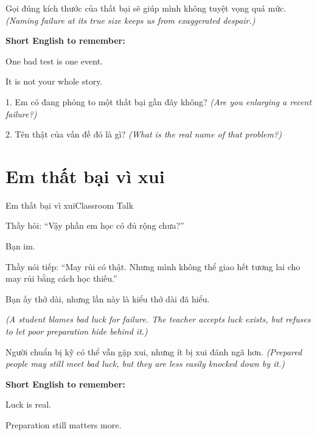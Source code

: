 \begin{baihoc}
Gọi đúng kích thước của thất bại sẽ giúp mình không tuyệt vọng quá mức.
\textit{(Naming failure at its true size keeps us from exaggerated despair.)}
\end{baihoc}

\begin{ghinhoanh}
\textbf{Short English to remember:}

One bad test is one event.

It is not your whole story.
\end{ghinhoanh}

\begin{tuhocnhanh}
1. Em có đang phóng to một thất bại gần đây không? \textit{(Are you enlarging a recent failure?)}

2. Tên thật của vấn đề đó là gì? \textit{(What is the real name of that problem?)}
\end{tuhocnhanh}
\ngancach

\section{Em thất bại vì xui}
\begin{truyen}{Em thất bại vì xui}{Classroom Talk}

Thầy hỏi: ``Vậy phần em học có đủ rộng chưa?''

Bạn im.

Thầy nói tiếp: ``May rủi có thật. Nhưng mình không thể giao hết tương lai cho may rủi bằng cách học thiếu.''

Bạn ấy thở dài, nhưng lần này là kiểu thở dài đã hiểu.

\textit{(A student blames bad luck for failure. The teacher accepts luck exists, but refuses to let poor preparation hide behind it.)}
\end{truyen}

\begin{baihoc}
Người chuẩn bị kỹ có thể vẫn gặp xui, nhưng ít bị xui đánh ngã hơn.
\textit{(Prepared people may still meet bad luck, but they are less easily knocked down by it.)}
\end{baihoc}

\begin{ghinhoanh}
\textbf{Short English to remember:}

Luck is real.

Preparation still matters more.
\end{ghinhoanh}

